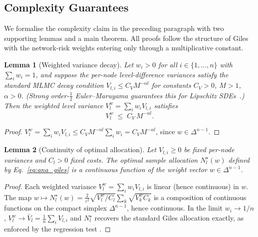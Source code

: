 \documentclass{ieeeaccess}
\newtheorem{lemma}{Lemma}
\begin{document}
\subsection{Complexity Guarantees}
\label{subsec:complexity}

We formalise the complexity claim in the preceding paragraph with two supporting lemmas and a
main theorem.  All proofs follow the structure of Giles~\cite{giles2015multilevel} with the
network-risk weights entering only through a multiplicative constant.

\begin{lemma}[Weighted variance decay]
\label{lem:var_decay}
Let $w_i > 0$ for all $i \in \{1,\ldots,n\}$ with $\sum_i w_i = 1$, and suppose the
per-node level-difference variances satisfy the standard MLMC decay condition
$V_{l,i} \le C_V M^{-\alpha l}$ for constants $C_V > 0$, $M > 1$, $\alpha > 0$.
(Strong order-$\tfrac{1}{2}$ Euler--Maruyama guarantees this for Lipschitz
SDEs~\cite{kloeden1992}.)
Then the weighted level variance $V_l^w = \sum_i w_i V_{l,i}$ satisfies
\begin{equation}
    V_l^w \;\le\; C_V\, M^{-\alpha l} .
\end{equation}
\end{lemma}
\begin{proof}
$V_l^w = \sum_i w_i V_{l,i} \le C_V M^{-\alpha l} \sum_i w_i = C_V M^{-\alpha l}$,
since $w \in \Delta^{n-1}$.
\end{proof}

\begin{lemma}[Continuity of optimal allocation]
\label{lem:continuity}
Let $V_{l,i} \ge 0$ be fixed per-node variances and $C_l > 0$ fixed costs.
The optimal sample allocation $N_l^{\star}(w)$ defined by Eq.~\eqref{eq:ana_giles} is a
continuous function of the weight vector $w \in \Delta^{n-1}$.
\end{lemma}
\begin{proof}
Each weighted variance $V_l^w = \sum_i w_i V_{l,i}$ is linear (hence continuous) in $w$.
The map $w \mapsto N_l^{\star}(w) = \tfrac{2}{\varepsilon^2}\sqrt{V_l^w/C_l}
\sum_k \sqrt{V_k^w C_k}$ is a composition of continuous functions on the compact
simplex $\Delta^{n-1}$, hence continuous.  In the limit $w_i \to 1/n$, $V_l^w \to
\bar V_l = \tfrac{1}{n}\sum_i V_{l,i}$ and $N_l^{\star}$ recovers the standard Giles
allocation exactly, as enforced by the regression test .
\end{proof}
\end{document}
